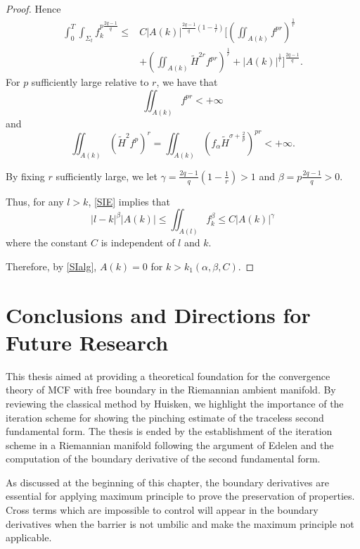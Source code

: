 \begin{proof}
    Hence
    \begin{equation*}
    \begin{split}
        \int_{0}^{T} \int_{\Sigma_t} f_{k}^{p \frac{2q-1}{q}} \leq &C \left| A(k) \right| ^{\frac{2q-1}{q}\left( 1-\frac{1}{r} \right) } [ \left( \iint_{A(k)}^{}f_{}^{pr}  \right) ^{\frac{1}{r}} \\
        &+ \left( \iint_{A(k)}^{}\tilde{H}^{2r} f_{}^{pr }  \right) ^{\frac{1}{r}}+\left| A(k) \right| ^{\frac{1}{r}} ] ^{\frac{2q-1}{q}}.
    \end{split}
    \end{equation*} 
    For $p$ sufficiently large relative to $r$, we have that 
    \[\iint_{A(k)}^{}f_{}^{pr } < + \infty \] and \[\iint_{A(k)}^{}\left( \tilde{H}^2f^p \right) ^r = \iint_{A(k)}^{}\left( f_{\alpha }\tilde{H}^{\sigma + \frac{2}{p}} \right) ^{pr}< + \infty .\]

    By fixing $r$ sufficiently large, we let $\gamma = \frac{2q-1}{q}\left( 1- \frac{1}{r} \right)>1 $ and $\beta = p \frac{2q-1}{q}>0 $.
    
    Thus, for any $l>k$, \autoref{SIE} implies that
    \[\left| l-k \right| ^{\beta }\left| A(k) \right| \leq \iint_{A(l)}^{}f_{k}^{\beta }  \leq C \left| A(k) \right| ^{\gamma }\]
    where the constant $C$ is independent of $l$ and $k$.

    Therefore, by \autoref{SIalg}, $A(k)=0$ for $k>k_1(\alpha , \beta , C)$. 
\end{proof}

\section{Conclusions and Directions for Future Research}
This thesis aimed at providing a theoretical foundation for the convergence theory of MCF with free boundary in the Riemannian ambient manifold. By reviewing the classical method by Huisken, we highlight the importance of the iteration scheme for showing the pinching estimate of the traceless second fundamental form. The thesis is ended by the establishment of the iteration scheme in a Riemannian manifold following the argument of Edelen and the computation of the boundary derivative of the second fundamental form.

As discussed at the beginning of this chapter, the boundary derivatives are essential for applying maximum principle to prove the preservation of properties. Cross terms which are impossible to control will appear in the boundary derivatives when the barrier is not umbilic and make the maximum principle not applicable. 

